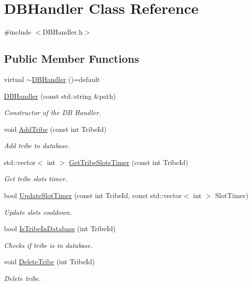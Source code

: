 \hypertarget{class_d_b_handler}{}\section{D\+B\+Handler Class Reference}
\label{class_d_b_handler}


{\ttfamily \#include $<$D\+B\+Handler.\+h$>$}

\subsection*{Public Member Functions}
\begin{DoxyCompactItemize}
\item 
virtual \mbox{\hyperlink{class_d_b_handler_a47f7963b489c9a50d9ed1ebad4427e92}{$\sim$\+D\+B\+Handler}} ()=default
\item 
\mbox{\hyperlink{class_d_b_handler_a5b98990456fb4436208d835332ee7a3e}{D\+B\+Handler}} (const std\+::string \&path)
\begin{DoxyCompactList}\small\item\em Constructor of the DB Handler. \end{DoxyCompactList}\item 
void \mbox{\hyperlink{class_d_b_handler_a8bf2abc53f0c4d7041fd8dacd3195df6}{Add\+Tribe}} (const int Tribe\+Id)
\begin{DoxyCompactList}\small\item\em Add tribe to database. \end{DoxyCompactList}\item 
std\+::vector$<$ int $>$ \mbox{\hyperlink{class_d_b_handler_aa829e3513b65be297f2bd4e5ab042e35}{Get\+Tribe\+Slots\+Timer}} (const int Tribe\+Id)
\begin{DoxyCompactList}\small\item\em Get tribe slots timer. \end{DoxyCompactList}\item 
bool \mbox{\hyperlink{class_d_b_handler_a62abea29518dc76d3fce4f05f78780d2}{Update\+Slot\+Timer}} (const int Tribe\+Id, const std\+::vector$<$ int $>$ Slot\+Timer)
\begin{DoxyCompactList}\small\item\em Update slots cooldown. \end{DoxyCompactList}\item 
bool \mbox{\hyperlink{class_d_b_handler_a4dc6835ae9459d3faacb8131b67a00d3}{Is\+Tribe\+In\+Database}} (int Tribe\+Id)
\begin{DoxyCompactList}\small\item\em Checks if tribe is in database. \end{DoxyCompactList}\item 
void \mbox{\hyperlink{class_d_b_handler_ad58b74ff1ddb803d2fe7e93744c6eb5f}{Delete\+Tribe}} (int Tribe\+Id)
\begin{DoxyCompactList}\small\item\em Delete tribe. \end{DoxyCompactList}\end{DoxyCompactItemize}


